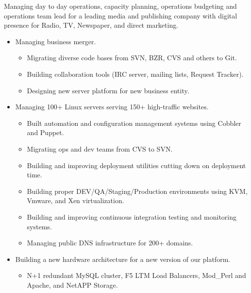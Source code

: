 \documentclass[fontsize=11pt]{scrartcl}
\begin{document}
  Managing day to day operations, capacity planning, operations budgeting
  and operations team lead for a leading media and publishing company with
  digital presence for Radio, TV, Newspaper, and direct marketing.

  \begin{itemize}
    \item
      Managing business merger.

      \begin{itemize}
        \item
          Migrating diverse code bases from SVN, BZR, CVS and others to Git.
        \item
          Building collaboration tools (IRC server, mailing lists, Request
          Tracker).
        \item
          Designing new server platform for new business entity.
      \end{itemize}
    \item
      Managing 100+ Linux servers serving 150+ high-traffic websites.

      \begin{itemize}
        \item
          Built automation and configuration management systems using Cobbler
          and Puppet.
        \item
          Migrating ops and dev teams from CVS to SVN.
        \item
          Building and improving deployment utilities cutting down on
          deployment time.
        \item
          Building proper DEV/QA/Staging/Production environments using KVM,
          Vmware, and Xen virtualization.
        \item
          Building and improving continuous integration testing and monitoring
          systems.
        \item
          Managing public DNS infrastructure for 200+ domains.
      \end{itemize}
    \item
      Building a new hardware architecture for a new version of our
      platform.

      \begin{itemize}
        \itemsep1pt\parskip0pt
        \item
          N+1 redundant MySQL cluster, F5 LTM Load Balancers, Mod\_Perl and
          Apache, and NetAPP Storage.
      \end{itemize}
  \end{itemize}
\end{document}
